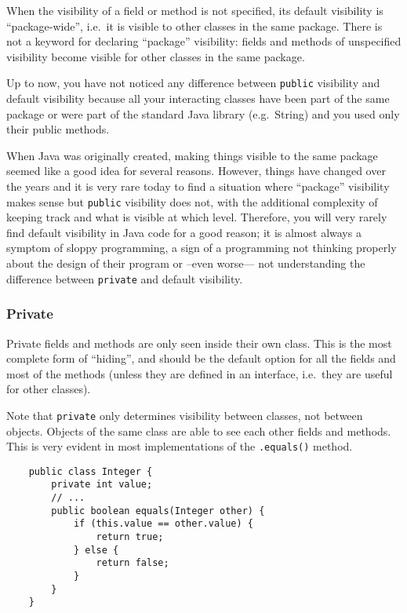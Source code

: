 When the visibility of a field or method is not specified, its default
visibility is ``package-wide'', i.e.~it is visible to other classes in
the same package. There is not a keyword for declaring ``package''
visibility: fields and methods of unspecified visibility become
visible for other classes in the same package. 

Up to now, you have not noticed any difference
between \verb+public+ visibility and default visibility because all
your interacting classes have been part of the same package or were
part of the standard Java library (e.g.~String) and you used only
their public methods. 

When Java was originally created, making things visible to the same
package seemed like a good idea for several reasons. However, things
have changed over the years and it is very rare today to find a
situation where ``package'' visibility makes sense but \verb+public+
visibility does not, with the additional complexity of keeping track
and what is visible at which level. Therefore, you will very rarely
find default visibility in Java code for a good reason; it is almost
always a symptom of sloppy programming, a sign of a programming not
thinking properly about the design of their program or --even worse---
not understanding the difference between \verb+private+ and default
visibility.   

\subsubsection{Private}
\label{sec:private}

Private fields and methods are only seen inside their own class. This
is the most complete form of ``hiding'', and should be the default
option for all the fields and most of the methods (unless they are
defined in an interface, i.e.~they are useful for other classes). 

Note that \verb+private+ only determines visibility between classes,
not between objects. Objects of the same class are able to see each
other fields and methods. This is very evident in most implementations
of the \verb+.equals()+ method. 

\begin{verbatim}
    public class Integer {
        private int value;
        // ...
        public boolean equals(Integer other) {
            if (this.value == other.value) {
                return true;
            } else {
                return false;
            }
        }
    }
\end{verbatim}

